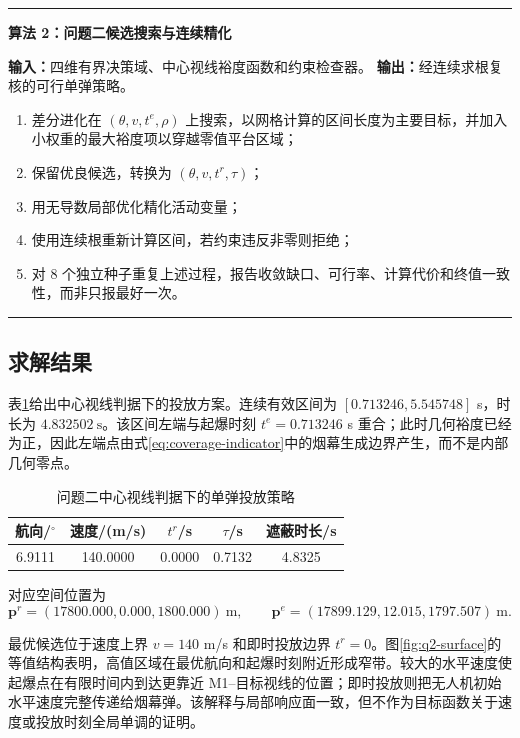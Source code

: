 \documentclass[UTF8,a4paper,12pt,fontset=windows]{ctexart}
\newcommand{\thead}[1]{{\bfseries\boldmath #1}}
\newenvironment{algobox}[1]
  {\par\medskip\noindent\begin{minipage}{\textwidth}\small\hrule\medskip\textbf{#1}\par\medskip}
  {\medskip\hrule\end{minipage}\par\medskip}
\begin{document}
\begin{algobox}{算法 2：问题二候选搜索与连续精化}
\textbf{输入：}四维有界决策域、中心视线裕度函数和约束检查器。\quad
\textbf{输出：}经连续求根复核的可行单弹策略。
\begin{enumerate}[label=\arabic*.,leftmargin=2em]
  \item 差分进化在 $(\theta,v,t^e,\rho)$ 上搜索，以网格计算的区间长度为主要目标，并加入小权重的最大裕度项以穿越零值平台区域；
  \item 保留优良候选，转换为 $(\theta,v,t^r,\tau)$；
  \item 用无导数局部优化精化活动变量；
  \item 使用连续根重新计算区间，若约束违反非零则拒绝；
  \item 对 8 个独立种子重复上述过程，报告收敛缺口、可行率、计算代价和终值一致性，而非只报最好一次。
\end{enumerate}
\end{algobox}

\subsection{求解结果}

表\ref{tab:q2}给出中心视线判据下的投放方案。连续有效区间为 $[0.713246,5.545748]$ s，时长为 $\bm{4.832502\ \mathrm{s}}$。该区间左端与起爆时刻 $t^e=0.713246$ s 重合；此时几何裕度已经为正，因此左端点由式\eqref{eq:coverage-indicator}中的烟幕生成边界产生，而不是内部几何零点。

\begin{table}[!htbp]
\centering
\caption{问题二中心视线判据下的单弹投放策略}
\label{tab:q2}
\small
\begin{tabular}{ccccc}
\toprule
\thead{航向/$^\circ$} & \thead{速度/(m/s)} & \thead{$t^r$/s} & \thead{$\tau$/s} & \thead{遮蔽时长/s}\\
\midrule
6.9111 & 140.0000 & 0.0000 & 0.7132 & 4.8325\\
\bottomrule
\end{tabular}
\end{table}
对应空间位置为
\[
\bm p^r=(17800.000,0.000,1800.000)\ \text{m},\qquad
\bm p^e=(17899.129,12.015,1797.507)\ \text{m}.
\]

最优候选位于速度上界 $v=140$ m/s 和即时投放边界 $t^r=0$。图\ref{fig:q2-surface}的等值结构表明，高值区域在最优航向和起爆时刻附近形成窄带。较大的水平速度使起爆点在有限时间内到达更靠近 M1--目标视线的位置；即时投放则把无人机初始水平速度完整传递给烟幕弹。该解释与局部响应面一致，但不作为目标函数关于速度或投放时刻全局单调的证明。
\end{document}

